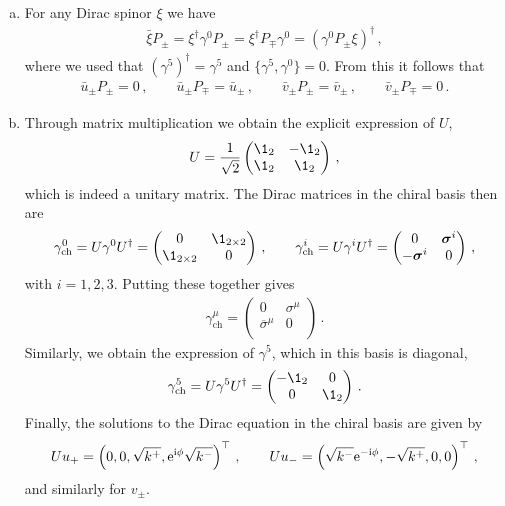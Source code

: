 \begin{enumerate}[a)]
\smallskip
\item For any Dirac spinor $\xi$ we have
\begin{align}
\bar{\xi} P_{\pm} = \xi^{\dagger} \gamma^0 P_{\pm} = \xi^{\dagger} P_{\mp} \gamma^0 = \left(\gamma^0 P_{\pm} \xi \right)^{\dagger} \,,
\end{align}
where we used that $(\gamma^5)^{\dagger} = \gamma^5$ and $\{\gamma^5,\gamma^0\} = 0$. From this it follows that
\begin{align}
\bar{u}_{\pm} P_{\pm} = 0 \,, \qquad \bar{u}_{\pm} P_{\mp} = \bar{u}_{\pm} \,, \qquad \bar{v}_{\pm} P_{\pm} = \bar{v}_{\pm} \,, \qquad  
 \bar{v}_{\pm} P_{\mp} = 0 \,.
\end{align}

\smallskip
\item Through matrix multiplication we obtain the explicit expression of $U$,
\begin{align}
U = \frac{1}{\sqrt{2}} \begin{pmatrix} \1_{2} & -\1_{2} \\ \1_{2} & \1_{2} \\ \end{pmatrix} \,,
\end{align}
which is indeed a unitary matrix. The Dirac matrices in the chiral basis then are
\begin{align}
\gamma^{0}_{\text{ch}}=U \gamma^{0} U^{\dagger} =  \left ( \begin{matrix}0 & {\1}_{2\times 2}\cr {\1}_{2\times 2} & 0\end{matrix}\right )\,, \qquad 
\gamma^{i}_{\text{ch}}= U \gamma^{i} U^{\dagger} = \left ( \begin{matrix}0 & \vec\sigma^{i}\cr -\vec\sigma^{i} & 0\end{matrix}\right )\, ,
\end{align}
with $i=1,2,3$. Putting these together gives
\begin{align} \label{eq:gammaCh}
\gamma^{\mu}_{\text{ch}} = \begin{pmatrix} 0 & \sigma^{\mu} \\ \overline{\sigma}^{\mu} & 0 \\ \end{pmatrix} \,.
\end{align}
Similarly, we obtain the expression of $\gamma^5$, which in this basis is diagonal,
\begin{align} \label{eq:gamma5ch}
\gamma^5_{\text{ch}}=U \gamma^{5} U^{\dagger} = \begin{pmatrix}- \1_{2} & 0 \\ 0 & \1_{2} \end{pmatrix} \,.
\end{align}
Finally, the solutions to the Dirac equation in the chiral basis are given by
\begin{align}
U u_+ = \left( 0, 0, \sqrt{k^+}, \mathrm{e}^{\mathrm{i} \phi} \sqrt{k^-} \right)^{\top} \,, \qquad 
U u_- =  \left( \sqrt{k^-} \mathrm{e}^{-\mathrm{i} \phi}, -\sqrt{k^+}, 0, 0 \right)^{\top}\,,
\end{align}
and similarly for $v_{\pm}$.


\end{enumerate}
